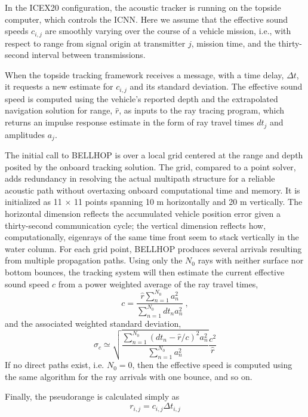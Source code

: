 \documentclass[preprint,TurnOnLineNumbers]{JASA}
\newcommand{\llabel}[1]{\hypertarget{llineno:#1}{\linelabel{#1}}}
\begin{document}
\llabel{2.10} In the ICEX20 configuration, the acoustic tracker is running on the topside computer, which controls the ICNN.
Here we assume that the effective sound speeds $c_{i,j}$ are smoothly varying over the course of a vehicle mission, i.e., with respect to range from signal origin at transmitter $j$, mission time, and the thirty-second interval between transmissions.

\llabel{1.15} When the topside tracking framework receives a message, with a time delay, $\Delta t$, it requests a new estimate for $c_{i,j}$ and its standard deviation.
The effective sound speed is computed using the vehicle's reported depth and the extrapolated navigation solution for range, $\hat{r}$, as inputs to the ray tracing program, which returns an impulse response estimate in the form of ray travel times $dt_{j}$ and amplitudes $a_{j}$.

\llabel{2.11} The initial call to BELLHOP is over a local grid centered at the range and depth posited by the onboard tracking solution.
The grid, compared to a point solver, adds redundancy in resolving the actual multipath structure for a reliable acoustic path without overtaxing onboard computational time and memory.
It is initialized as 11 $\times$ 11 points spanning 10 m horizontally and 20 m vertically.
The horizontal dimension reflects the accumulated vehicle position error given a thirty-second communication cycle; the vertical dimension reflects how, computationally, eigenrays of the same time front seem to stack vertically in the water column. \llabel{1.17}
For each grid point, BELLHOP produces several arrivals resulting from multiple propagation paths.
Using only the $N_0$ rays with neither surface nor bottom bounces, the tracking system will then estimate the current effective sound speed $c$ from a power weighted average of the ray travel times,
\begin{equation}
c = \frac{\hat{r} \sum_{n=1}^{N_{0}} a_{n}^{2}}{\sum_{n=1}^{N_{0}} dt_{n}a_{n}^{2}} ~, 
\end{equation}
and the associated weighted standard deviation,
\begin{equation}
\sigma_{c} \simeq \sqrt{\frac {\sum_{n=1}^{N_{0}} (dt_{n}-\hat{r}/c)^{2}a_{n}^{2}}{ \sum_{n=1}^{N_{0}} a_{n}^{2}} } \frac{c^{2}}{\hat{r}}
\end{equation}
If no direct paths exist, i.e. $N_{0}=0$, then the effective speed is computed using the same algorithm for the ray arrivals with one bounce, and so on.

Finally, the pseudorange is calculated simply as
\begin{equation}
r_{i,j} = c_{i,j} \Delta t_{i,j} 
\end{equation}
\end{document}
